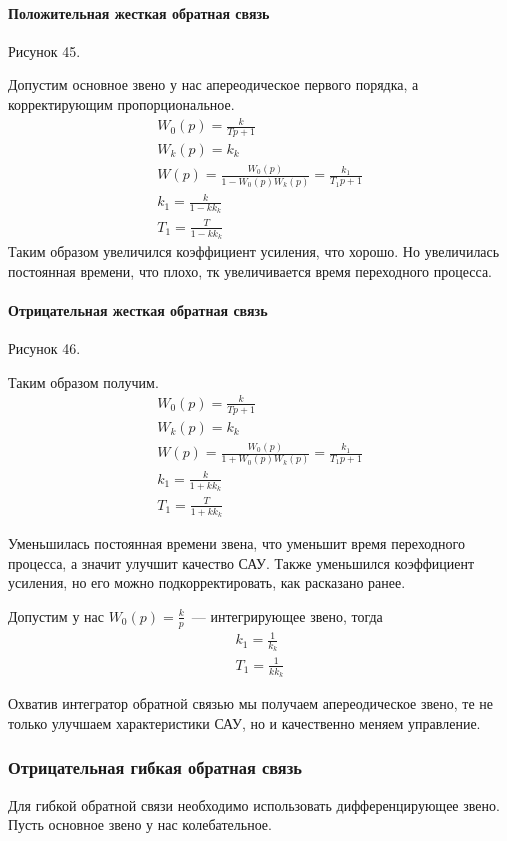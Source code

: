 \paragraph{Положительная жесткая обратная связь}
Рисунок 45.

Допустим основное звено у нас апереодическое первого порядка, а корректирующим пропорциональное.
\begin{align*}
	W_0(p)=\frac{k}{Tp+1} \\
	W_k(p)=k_k \\
	W(p)=\frac{W_0(p)}{1-W_0(p)W_k(p)}=\frac{k_1}{T_1p+1} \\
	k_1 = \frac{k}{1-kk_k} \\
	T_1=\frac{T}{1-kk_k}
\end{align*}
Таким образом увеличился коэффициент усиления, что хорошо. Но увеличилась постоянная времени, что плохо, тк увеличивается время переходного процесса.

\paragraph{Отрицательная жесткая обратная связь}
Рисунок 46.

Таким образом получим.
\begin{align*}
	W_0(p)=\frac{k}{Tp+1} \\
	W_k(p)=k_k \\
	W(p)=\frac{W_0(p)}{1+W_0(p)W_k(p)}=\frac{k_1}{T_1p+1} \\
	k_1 = \frac{k}{1+kk_k} \\
	T_1=\frac{T}{1+kk_k}
\end{align*}

Уменьшилась постоянная времени звена, что уменьшит время переходного процесса, а значит улучшит качество САУ. Также уменьшился коэффициент усиления, но его можно подкорректировать, как расказано ранее.

Допустим у нас $W_0(p)=\frac{k}p$~--- интегрирующее звено, тогда
\begin{align*}
	k_1=\frac1{k_k} \\
	T_1=\frac1{kk_k}
\end{align*}

Охватив интегратор обратной связью мы получаем апереодическое звено, те не только улучшаем характеристики САУ, но и качественно меняем управление.

\subsubsection{Отрицательная гибкая обратная связь}
Для гибкой обратной связи необходимо использовать дифференцирующее звено. Пусть основное звено у нас колебательное.

